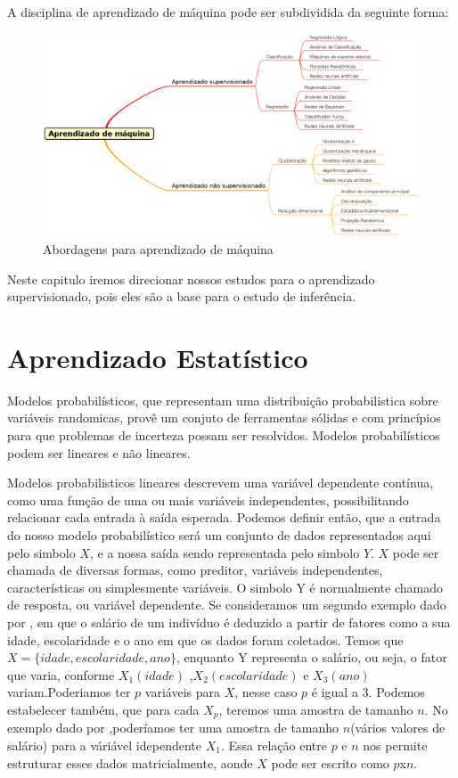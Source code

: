 A disciplina de aprendizado de máquina pode ser subdividida da seguinte forma:
\begin{figure}[h]
	\centering
	\label{fig01}
        \includegraphics[scale=0.48]{figuras/mind1.eps}
	\caption{Abordagens para aprendizado de máquina}
\end{figure}
Neste capitulo iremos direcionar nossos estudos para o aprendizado supervisionado, pois eles são a base para o estudo de inferência.

\section{Aprendizado Estatístico}

Modelos probabilísticos, que representam uma distribuição probabilistica sobre variáveis randomicas, provê um conjuto de ferramentas sólidas e com princípios para
que problemas de incerteza possam ser resolvidos\cite{Sun}. Modelos probabilísticos podem ser lineares e não lineares.

Modelos probabilisticos lineares descrevem uma variável dependente contínua, como uma função de uma ou mais variáveis independentes, possibilitando relacionar cada entrada à saída
esperada. Podemos definir então, que a entrada do nosso modelo probabilístico será um conjunto de dados representados aqui pelo simbolo $X$, e a nossa saída sendo representada pelo simbolo $Y$.  $X$ pode ser chamada de diversas formas, como preditor, variáveis independentes, características ou simplesmente variáveis.
O simbolo Y é normalmente chamado de resposta, ou variável dependente. Se consideramos um segundo exemplo dado por \cite{James}, em que o salário de um indivíduo é deduzido a partir
de fatores como a sua idade, escolaridade e o ano em que os dados foram coletados. Temos que $X = \{idade, escolaridade, ano\}$, enquanto Y representa o salário, ou seja, o fator que varia,
conforme $X_1(idade)$  ,$X_2(escolaridade)$ e $X_3(ano)$ variam.Poderiamos ter $p$ variáveis para $X$, nesse caso $p$ é igual a 3.
Podemos estabelecer também, que para cada $X_p$, teremos uma amostra de tamanho $n$. No exemplo dado por \cite{James},poderíamos ter uma amostra de tamanho $n$(vários valores de salário) para a váriável idependente $X_1$. Essa relação entre $p$ e $n$ nos permite estruturar esses dados matricialmente, aonde $X$ pode ser escrito como $p$x$n$\cite{James}.

